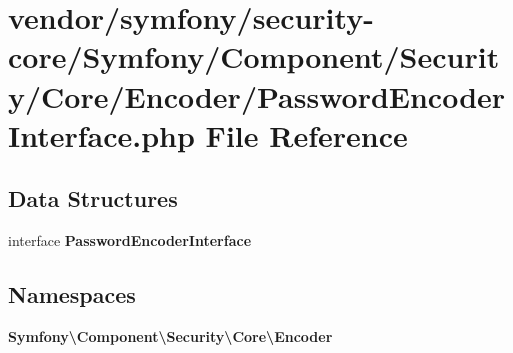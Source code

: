 \section{vendor/symfony/security-\/core/\+Symfony/\+Component/\+Security/\+Core/\+Encoder/\+Password\+Encoder\+Interface.php File Reference}
\label{_password_encoder_interface_8php}
\subsection*{Data Structures}
\begin{DoxyCompactItemize}
\item 
interface {\bf Password\+Encoder\+Interface}
\end{DoxyCompactItemize}
\subsection*{Namespaces}
\begin{DoxyCompactItemize}
\item 
 {\bf Symfony\textbackslash{}\+Component\textbackslash{}\+Security\textbackslash{}\+Core\textbackslash{}\+Encoder}
\end{DoxyCompactItemize}

